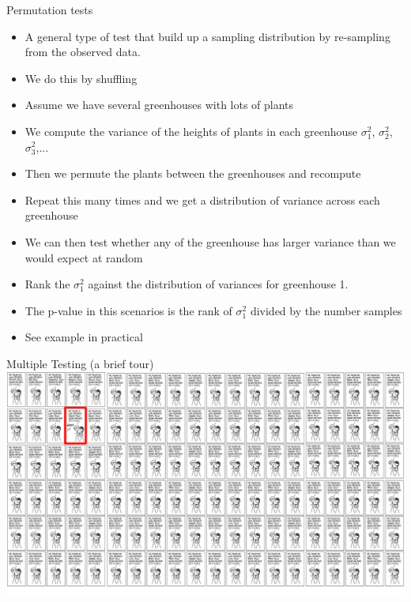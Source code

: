 \documentclass{bredelebeamer}
\begin{document}
\begin{frame}{Permutation tests}
\begin{block}

\begin{itemize}
	
\item A general type of test that build up a sampling distribution by re-sampling from the observed data. 
\item We do this by shuffling
\item Assume we have several greenhouses with lots of plants
\item We compute the variance of the heights of plants in each greenhouse $\sigma_1^2$, $\sigma_2^2$, $\sigma_3^2$,...
\item Then we permute the plants between the greenhouses and recompute
\item Repeat this many times and we get a distribution of variance across each greenhouse
\item We can then test whether any of the greenhouse has larger variance than we would expect at random
\item Rank the $\sigma^2_1$ against the distribution of variances for greenhouse 1.
\item The p-value in this scenarios is the rank of $\sigma^2_1$ divided by the number samples
\item See example in practical

\end{itemize}
\end{block}
\end{frame}

\begin{frame}{Multiple Testing (a brief tour)}
	\includegraphics[width=1\textwidth]{phacking}
\end{frame}
\end{document}
